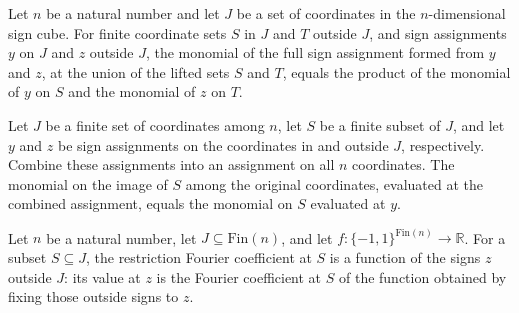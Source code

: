 \begin{theorem}
\label{FABL.indexedMonomial_lift_union_combine}
\leanok
{}
Let $n$ be a natural number and let $J$ be a set of coordinates in the $n$-dimensional
sign cube. For finite coordinate sets $S$ in $J$ and $T$ outside $J$, and sign
assignments $y$ on $J$ and $z$ outside $J$, the monomial of the full sign assignment
formed from $y$ and $z$, at the union of the lifted sets $S$ and $T$, equals the product
of the monomial of $y$ on $S$ and the monomial of $z$ on $T$.
\end{theorem}

\begin{theorem}
\label{FABL.monomial_liftFreeFrequency_combine}
\leanok
{}
Let $J$ be a finite set of coordinates among $n$, let $S$ be a finite subset of $J$, and
let $y$ and $z$ be sign assignments on the coordinates in and outside $J$, respectively.
Combine these assignments into an assignment on all $n$ coordinates. The monomial on the
image of $S$ among the original coordinates, evaluated at the combined assignment,
equals the monomial on $S$ evaluated at $y$.
\end{theorem}

\begin{definition}
\label{FABL.restrictionFourierCoeff}
\leanok
{}
Let $n$ be a natural number, let $J\subseteq\mathrm{Fin}(n)$, and let
$f:\{−1,1\}^{\mathrm{Fin}(n)}\to\mathbb R$. For a subset $S\subseteq J$, the restriction
Fourier coefficient at $S$ is a function of the signs $z$ outside $J$: its value at $z$
is the Fourier coefficient at $S$ of the function obtained by fixing those outside signs
to $z$.
\end{definition}

